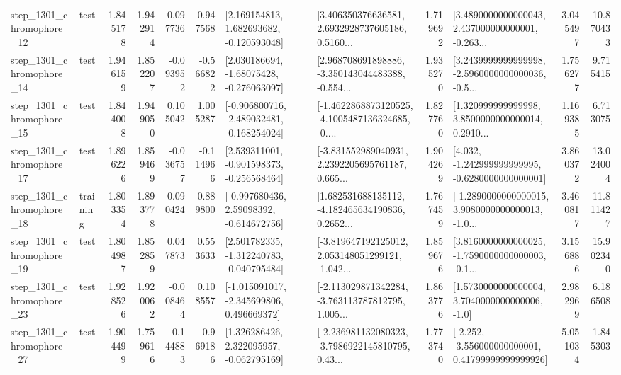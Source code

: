 \begin{tabular}{llrrrrllrlrr}
 step\_1301\_chromophore\_12 &      test &      1.845178 &    1.942914 &      0.097736 &  0.947568 &    [2.169154813, 1.682693682, -0.120593048] &  [3.406350376636581, 2.6932928737605186, 0.5160... &       1.719692 &  [3.4890000000000043, 2.437000000000001, -0.263... &            3.045497 &         10.870433 \\
 step\_1301\_chromophore\_14 &      test &      1.946159 &    1.852207 &     -0.093952 & -0.566822 &    [2.030186694, -1.68075428, -0.276063097] &  [2.968708691898886, -3.350143044483388, -0.554... &       1.935270 &  [3.2439999999999998, -2.5960000000000036, -0.5... &            1.756277 &          9.715415 \\
 step\_1301\_chromophore\_15 &      test &      1.844008 &    1.949050 &      0.105042 &  1.005287 &  [-0.906800716, -2.489032481, -0.168254024] &  [-1.4622868873120525, -4.1005487136324685, -0.... &       1.827760 &  [1.320999999999998, 3.8500000000000014, 0.2910... &            1.169385 &          6.713075 \\
 step\_1301\_chromophore\_17 &      test &      1.896226 &    1.859469 &     -0.036757 & -0.114966 &   [2.539311001, -0.901598373, -0.256568464] &  [-3.831552989040931, 2.2392205695761187, 0.665... &       1.904269 &   [4.032, -1.242999999999995, -0.6280000000000001] &            3.860372 &         13.024004 \\
 step\_1301\_chromophore\_18 &  training &      1.803354 &    1.893778 &      0.090424 &  0.889800 &    [-0.997680436, 2.59098392, -0.614672756] &  [1.682531688135112, -4.182465634190836, 0.2652... &       1.767459 &  [-1.2890000000000015, 3.9080000000000013, -1.0... &            3.460817 &         11.811427 \\
 step\_1301\_chromophore\_19 &      test &      1.804987 &    1.852859 &      0.047873 &  0.553633 &   [2.501782335, -1.312240783, -0.040795484] &  [-3.819647192125012, 2.053148051299121, -1.042... &       1.859676 &  [3.8160000000000025, -1.7590000000000003, -0.1... &            3.156886 &         15.902340 \\
 step\_1301\_chromophore\_23 &      test &      1.928526 &    1.920062 &     -0.008464 &  0.108557 &   [-1.015091017, -2.345699806, 0.496669372] &  [-2.113029871342284, -3.763113787812795, 1.005... &       1.863776 &     [1.5730000000000004, 3.7040000000000006, -1.0] &            2.982969 &          6.186508 \\
 step\_1301\_chromophore\_27 &      test &      1.904499 &    1.759616 &     -0.144883 & -0.969186 &    [1.326286426, 2.322095957, -0.062795169] &  [-2.236981132080323, -3.7986922145810795, 0.43... &       1.773740 &  [-2.252, -3.556000000000001, 0.41799999999999926] &            5.051034 &          1.845303 \\

\end{tabular}
